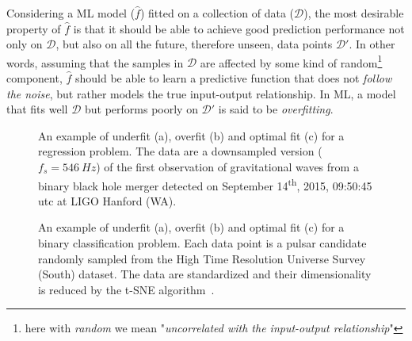 		Considering a ML model ($\hat f$) fitted on a collection of data ($\mathcal{D}$), the most desirable property of $\hat f$ is that it should be able to achieve good prediction performance not only on $\mathcal{D}$, but also on all the future, therefore unseen, data points $\mathcal{D}'$.
		In other words, assuming that the samples in $\mathcal{D}$ are affected by some kind of random\footnote{here with \textit{random} we mean "\textit{uncorrelated with the input-output relationship}"} component, $\hat f$ should be able to learn a predictive function that does not \textit{follow the noise}, but rather models the true input-output relationship.
		In ML, a model that fits well $\mathcal{D}$ but performs poorly on $\mathcal{D}'$ is said to be \textit{overfitting}.

	  \begin{figure}[!h]
	  	\centering
	      \hfill%
	  	\caption{An example of underfit (a), overfit (b) and optimal fit (c) for a regression problem. The data are a downsampled version ($f_s = 546~Hz$) of the first observation of gravitational waves from a binary black hole merger detected on September 14\textsuperscript{th}, 2015, 09:50:45 {\sc utc} at LIGO Hanford (WA).}\label{fig:regression_fit}
	  \end{figure}

	  \begin{figure}[!h]
			\centering
			\hfill%
			\caption{An example of underfit (a), overfit (b) and optimal fit (c) for a binary classification problem. Each data point is a pulsar candidate randomly sampled from the High Time Resolution Universe Survey (South) dataset. The data are standardized and their dimensionality is reduced by the t-SNE algorithm~\cite{van2008visualizing}. }\label{fig:classification_fit}
	  \end{figure}


